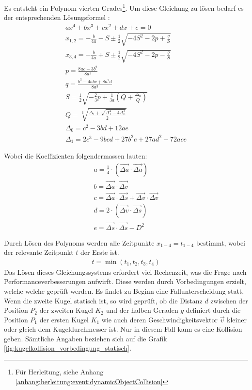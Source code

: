 Es entsteht ein Polynom vierten Grades\footnote{Für Herleitung, siehe Anhang \ref{anhang:herleitung:event:dynamicObjectCollision}}.
Um diese Gleichung zu lösen bedarf es der entsprechenden Lösungsformel \cite{wiki.polynom:1}:
\begin{align}
    ax^4 + bx^3 + cx^2 + dx + e = 0\\
    x_{1,2} = -\frac{b}{4a} - S \pm \frac{1}{2}\sqrt{-4S^2 - 2p + \frac{q}{S}}\\
    x_{3,4} = -\frac{b}{4a} + S \pm \frac{1}{2}\sqrt{-4S^2 - 2p - \frac{q}{S}}\\
    p = \frac{8ac - 3b^2}{8a^2}\\
    q = \frac{b^3 - 4abc + 8a^{2}d}{8a^3}\\
    S = \frac{1}{2}\sqrt{-\frac{2}{3}p + \frac{1}{3a}(Q + \frac{\Delta_0}{Q})}\\
    Q = \sqrt[3]{\frac{\Delta_1 + \sqrt{\Delta_{1}^2 - 4\Delta_{0}^3}}{2}}\\
    \Delta_0 = c^2 - 3bd + 12ae\\
    \Delta_1 = 2c^3 - 9bcd + 27b^{2}e + 27ad^2 - 72ace
\end{align}

Wobei die Koeffizienten folgendermassen lauten:
\begin{align}
    a = \frac{1}{4} \cdot (\vec{\Delta a} \cdot \vec{\Delta a})\\
    b = \vec{\Delta a} \cdot \vec{\Delta v}\\
    c = \vec{\Delta a} \cdot \vec{\Delta s} + \vec{\Delta v} \cdot \vec{\Delta v}\\
    d = 2 \cdot (\vec{\Delta v} \cdot \vec{\Delta s})\\
    e = \vec{\Delta s} \cdot \vec{\Delta s} - D^2
\end{align}

Durch Lösen des Polynoms werden alle Zeitpunkte $x_{1-4} = t_{1-4}$ bestimmt, wobei der relevante Zeitpunkt $t$ der
Erste ist.
\begin{align}
    t = \min{(t_1, t_2, t_3, t_4)}
\end{align}
\newpage
Das Lösen dieses Gleichungssystems erfordert viel Rechenzeit, was die Frage nach Performanceverbesserungen aufwirft.
Diese werden durch Vorbedingungen erzielt, welche welche geprüft werden. Es findet zu Beginn eine Fallunterscheidung
statt. Wenn die zweite Kugel statisch ist, so wird geprüft, ob die Distanz $d$ zwischen der Position $P_2$ der zweiten Kugel
$K_2$ und der halben Geraden $g$ definiert durch die Position $P_1$ der ersten Kugel $K_1$ wie auch deren Geschwindigkeitsvektor
$\vec{v}$ kleiner oder gleich dem Kugeldurchmesser ist. Nur in diesem Fall kann es eine Kollision geben.
Sämtliche Angaben beziehen sich auf die Grafik \ref{fig:kugelkollision_vorbedingung_statisch}.

